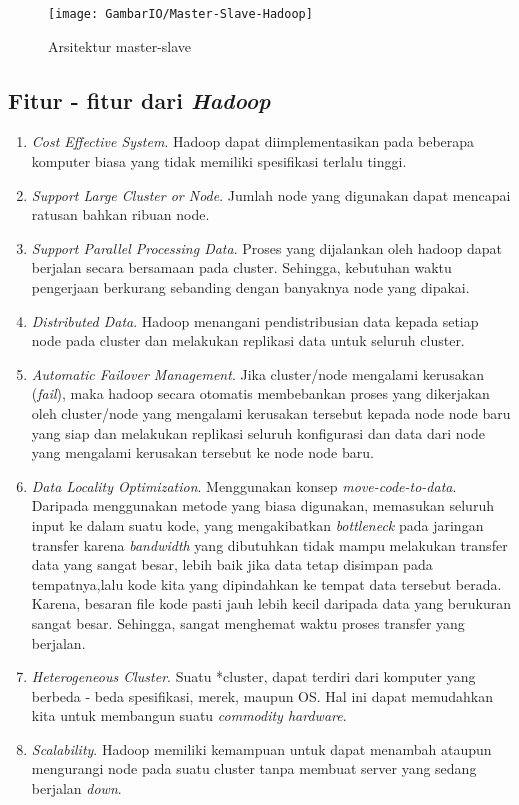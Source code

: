 	\begin{figure}[ht]
			\centering
			\texttt{[image: GambarIO/Master-Slave-Hadoop]}
			\caption[Arsitektur master-slave]{Arsitektur master-slave}
			\label{fig:Arsitektur master-slave}
		\end{figure}
	
	\subsection{Fitur - fitur dari \textit{Hadoop} \cite{Lam:2010:HA:1965594}}
	\begin{enumerate}
		\item \textit{Cost Effective System}.
		Hadoop dapat diimplementasikan pada beberapa komputer biasa yang tidak memiliki spesifikasi terlalu tinggi. 
		\item \textit{Support Large Cluster or Node}.
		Jumlah node yang digunakan dapat mencapai ratusan bahkan ribuan node.
		\item \textit{Support Parallel Processing Data}.
		Proses yang dijalankan oleh hadoop dapat berjalan secara bersamaan pada cluster. Sehingga, kebutuhan waktu pengerjaan berkurang sebanding dengan banyaknya node yang dipakai.
		\item \textit{Distributed Data}.
		Hadoop menangani pendistribusian data kepada setiap node pada cluster dan melakukan replikasi data untuk seluruh cluster.
		\item \textit{Automatic Failover Management}.
		Jika cluster/node mengalami kerusakan (\textit{fail}), maka hadoop secara otomatis membebankan proses yang dikerjakan oleh cluster/node yang mengalami kerusakan tersebut kepada node node baru yang siap dan melakukan replikasi seluruh konfigurasi dan data dari node yang mengalami kerusakan tersebut ke node node baru.
		\item \textit{Data Locality Optimization}.
		Menggunakan konsep \textit{move-code-to-data}. Daripada menggunakan metode yang biasa digunakan, memasukan seluruh input ke dalam suatu kode, yang mengakibatkan \textit{bottleneck} pada jaringan transfer karena \textit{bandwidth} yang dibutuhkan tidak mampu melakukan transfer data yang sangat besar, lebih baik jika data tetap disimpan pada tempatnya,lalu kode kita yang dipindahkan ke tempat data tersebut berada. Karena, besaran file kode pasti jauh lebih kecil daripada data yang berukuran sangat besar. Sehingga, sangat menghemat waktu proses transfer yang berjalan.
	\item \textit{Heterogeneous Cluster}.
	Suatu *cluster, dapat terdiri dari komputer yang berbeda - beda spesifikasi, merek, maupun OS. Hal ini dapat memudahkan kita untuk membangun suatu \textit{commodity hardware}.
	\item \textit{Scalability}.
	Hadoop memiliki kemampuan untuk dapat menambah ataupun mengurangi node pada suatu cluster tanpa membuat server yang sedang berjalan \textit{down}.
	\end{enumerate}
	
